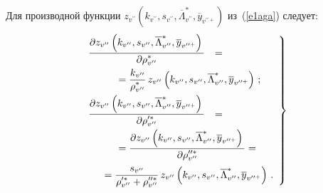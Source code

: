 \begin{multicols}{2}
\noindent
   Для производной функции 
   $z_{ v^{\prime\prime}}\left(k_{ v^{\prime\prime}}, s_{ v^{\prime\prime}}, 
\overline{\Lambda}^*_{ v^{\prime\prime}}, \overline{y}_{ v^{\prime\prime 
+}}\right)$ из~(\ref{e1aga}) следует:
\begin{equation}
\left.
   \begin{array}{rl}
   \fr{\partial z_{ v^{\prime\prime}}\left(k_{ v^{\prime\prime}}, s_{ 
v^{\prime\prime}}, \overline{\Lambda}^*_{ v^{\prime\prime}}, \overline{y}_{ 
v^{\prime\prime +}}\right)}{\partial \rho^*_{ v^{\prime\prime}}}&={}\\[9pt]
&\hspace*{-35mm}{}=
   \fr{k_{ v^{\prime\prime}}}{\rho^*_{ v^{\prime\prime}}}\,z_{ 
v^{\prime\prime}} \left(k_{ v^{\prime\prime}}, s_{ v^{\prime\prime}}, 
\overline{\Lambda}_{ v^{\prime\prime}}^*, \overline{y}_{ v^{\prime\prime +}}\right)\,;
 \\[9pt]
   \fr{\partial z_{ v^{\prime\prime}}\left(k_{ v^{\prime\prime}}, s_{ 
v^{\prime\prime}}, \overline{\Lambda}^*_{ v^{\prime\prime}}, \overline{y}_{ 
v^{\prime\prime +}}\right)}{\partial \rho_{ v^{\prime\prime}}^{\prime *}}&={}\\[9pt]
&\hspace*{-35mm}{}=
   \fr{\partial z_{ v^{\prime\prime}}\left(k_{ v^{\prime\prime}}, 
   s_{ v^{\prime\prime}}, \overline{\Lambda}^*_{ v^{\prime\prime}}, 
\overline{y}_{ v^{\prime\prime +}}\right)}{\partial \rho_{ 
v^{\prime\prime}}^{\prime\prime *}}={}\\[9pt]
&{}\hspace*{-40mm}=\fr{s_{ v^{\prime\prime}}}
   {\rho^{\prime *}_{ v^{\prime\prime}}+\rho_{ 
v^{\prime\prime}}^{\prime\prime *}}\,z_{v^{\prime\prime}}\left(
   k_{ v^{\prime\prime}}, s_{ v^{\prime\prime}}, 
   \overline{\Lambda}_{v^{\prime\prime}}^*, \overline{y}_{ v^{\prime\prime +}}\right)\,.
   \end{array}
   \right\}
   \label{e10aga}
   \end{equation}
   

\end{multicols}
